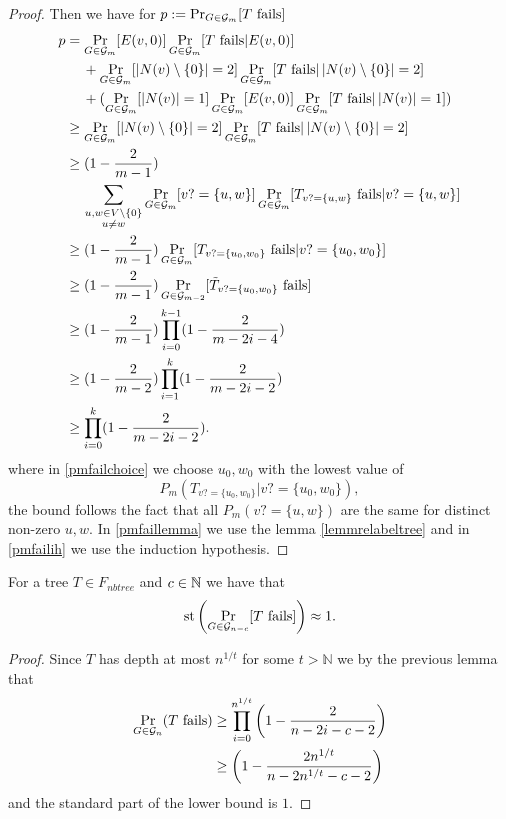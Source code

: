 \begin{proof}
Then we have for $p:=\Pr_{G\in\mathcal{G}_m}[\text{$T$ fails}]$
\begin{align}
p&=\Pr_{G\in\mathcal{G}_m}[E(v,0)]\Pr_{G\in\mathcal{G}_m}[\text{$T$ fails}|E(v,0)]\\
&\:\phantom{=}\:+\Pr_{G\in\mathcal{G}_m}[\left|{N(v)\setminus\{0\}}\right|=2]\Pr_{G\in\mathcal{G}_m}[\text{$T$ fails}|\left|{N(v)\setminus\{0\}}\right|=2]\\
&\:\phantom{=}\:+(\Pr_{G\in\mathcal{G}_m}[\left|{N(v)}\right|=1]\Pr_{G\in\mathcal{G}_m}[E(v,0)]\Pr_{G\in\mathcal{G}_m}[\text{$T$ fails}|\left|{N(v)}\right|=1])\\
&\geq \Pr_{G\in\mathcal{G}_m}[\left|{N(v)\setminus\{0\}}\right|=2]\Pr_{G\in\mathcal{G}_m}[\text{$T$ fails}|\left|{N(v)\setminus\{0\}}\right|=2]\\
&\geq (1-\frac{2}{m-1})\\
&\:\phantom{=}\:\sum_{\substack{u,w\in V\setminus \{0\} \\ u\not= w}}\Pr_{G\in\mathcal{G}_m}[v?=\{u,w\}]\Pr_{G\in\mathcal{G}_m}[T_{v?=\{u,w\}}\text{ fails}|v?=\{u,w\}]\\
&\geq(1-\frac{2}{m-1})\Pr_{G\in\mathcal{G}_m}[T_{v?=\{u_0,w_0\}}\text{ fails}|v?=\{u_0,w_0\}]\label{pmfailchoice}\\
&\geq(1-\frac{2}{m-1})\Pr_{G\in\mathcal{G}_{m-2}}[\tilde T_{v?=\{u_0,w_0\}}\text{ fails}]\label{pmfaillemma}\\
&\geq(1-\frac{2}{m-1})\prod_{i=0}^{k-1}(1-\frac{2}{m-2i-4})\label{pmfailih}\\
&\geq(1-\frac{2}{m-2})\prod_{i=1}^{k}(1-\frac{2}{m-2i-2})\\
&\geq\prod_{i=0}^{k}(1-\frac{2}{m-2i-2}).
\end{align}
where in \eqref{pmfailchoice} we choose $u_0,w_0$ with the lowest value of \[P_m(\text{$T_{v?=\{u_0,w_0\}}|v?=\{u_0,w_0\}$}),\] the bound follows the fact that all $P_m(v?=\{u,w\})$ are the same for distinct non-zero $u,w$. In \eqref{pmfaillemma} we use the lemma \ref{lemmrelabeltree} and in \eqref{pmfailih} we use the induction hypothesis.
\end{proof}

\begin{crll}\label{crllpPathtreefail}
For a tree $T\in F_{nbtree}$ and $c\in \mathbb{N}$ we have that
\[\text{st}\left(\Pr_{G\in\mathcal{G}_{n-c}}[T\text{ fails}]\right)\approx 1.\]
\end{crll}
\begin{proof}
Since $T$ has depth at most $n^{1/t}$ for some $t>\mathbb{N}$ we by the previous lemma that
\begin{align}
\Pr_{G\in\mathcal{G}_n}(\text{$T$ fails})&\geq \prod_{i=0}^{n^{1/t}}\left(1-\frac{2}{n-2i-c-2}\right)\\
&\geq \left(1-\frac{2n^{1/t}}{n-2n^{1/t}-c-2}\right)
\end{align}
and the standard part of the lower bound is $1$.
\end{proof}

